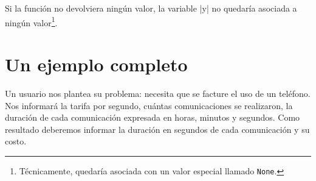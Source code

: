 Si la función no devolviera ningún valor, la variable |y| no quedaría asociada
a ningún valor\footnote{Técnicamente, quedaría asociada con un valor especial
llamado \texttt{None}.}.

\section{Un ejemplo completo}

\begin{problemac}
Un usuario nos plantea su problema: necesita que se facture el uso de un teléfono.
Nos informará la tarifa por segundo, cuántas comunicaciones se realizaron,
la duración de cada comunicación expresada en horas, minutos y segundos.
Como resultado deberemos informar la duración en segundos de cada comunicación y
su costo.
\end{problemac}

